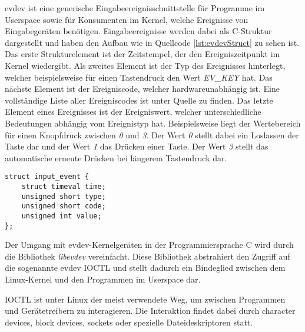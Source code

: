 \ac{evdev} ist eine generische Eingabeereignisschnittstelle für Programme im Userspace sowie für Konsumenten im Kernel, welche Ereignisse von Eingabegeräten benötigen. Eingabeereignisse werden dabei als C-Struktur dargestellt und haben den Aufbau wie in Quellcode \ref{lst:evdevStruct} zu sehen ist. Das erste Strukturelement ist der Zeitstempel, der den Ereigniszeitpunkt im Kernel wiedergibt. Als zweites Element ist der Typ des Ereignisses hinterlegt, welcher beispielsweise für einen Tastendruck den Wert \textit{EV\_KEY} hat. Das nächste Element ist der Ereigniscode, welcher hardwareunabhängig ist. Eine vollständige Liste aller Ereigniscodes ist unter Quelle \cite{linuxInputEvents} zu finden. Das letzte Element eines Ereignisses ist der Ereigniswert, welcher unterschiedliche Bedeutungen abhängig vom Ereignistyp hat. Beispielsweise liegt der Wertebereich für einen Knopfdruck zwischen \textit{0} und \textit{3}. Der Wert \textit{0} stellt dabei ein Loslassen der Taste dar und der Wert \textit{1} das Drücken einer Taste. Der Wert \textit{3} stellt das automatische erneute Drücken bei längerem Tastendruck dar. \cites{pavlikInput}{pavlikUserspaceAPI}

\begin{lstlisting}[caption=C-Strukuraufbau eines Eingabeereignisses von evdev \cite{pavlikInput}, label={lst:evdevStruct}, style=generalStyle]
struct input_event {
    struct timeval time;
    unsigned short type;
    unsigned short code;
    unsigned int value;
};
\end{lstlisting}

Der Umgang mit \ac{evdev}-Kernelgeräten in der Programmiersprache C wird durch die Bibliothek \textit{libevdev} vereinfacht. Diese Bibliothek abstrahiert den Zugriff auf die sogenannte \ac{evdev} \ac{IOCTL} \cite{ldpIOCTL} und stellt dadurch ein Bindeglied zwischen dem Linux-Kernel und den Programmen im Userspace dar. \cites{freedesktopLibevdevDoc}{freedesktopLibevdev}

\ac{IOCTL} ist unter Linux der meist verwendete Weg, um zwischen Programmen und Gerätetreibern zu interagieren. Die Interaktion findet dabei durch character devices, block devices, sockets oder spezielle Dateideskriptoren statt. \cite{linuxIOCTL}